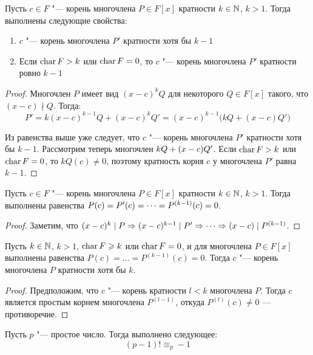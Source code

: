 \begin{theorem}
	Пусть $c \in F$ "--- корень многочлена $P \in F[x]$ кратности $k \in \mathbb{N}$, $k > 1$. Тогда выполнены следующие свойства:
	\begin{enumerate}
		\item $c$ "--- корень многочлена $P'$ кратности хотя бы $k - 1$
		\item Если $\operatorname{char}{F} > k$ или $\operatorname{char}{F} = 0$, то $c$ "--- корень многочлена $P'$ кратности ровно $k - 1$
	\end{enumerate}
\end{theorem}

\begin{proof}
	Многочлен $P$ имеет вид $(x - c)^kQ$ для некоторого $Q \in F[x]$ такого, что $(x - c)\nmid Q$. Тогда:
	\[P' = k(x - c)^{k - 1}Q + (x - c)^kQ' = (x - c)^{k - 1}\big(kQ + (x-c)Q'\big)\]
	
	Из равенства выше уже следует, что $c$ "--- корень многочлена $P'$ кратности хотя бы $k - 1$. Рассмотрим теперь многочлен $kQ \hm{+} (x - c)Q'$. Если $\operatorname{char}{F} > k$ или $\operatorname{char}{F} = 0$, то $kQ(c) \ne 0$, поэтому кратность корня $c$ у многочлена $P'$ равна $k - 1$.
\end{proof}

\begin{corollary}
	Пусть $c \in F$ "--- корень многочлена $P \in F[x]$ кратности $k \in \mathbb{N}$, $k > 1$. Тогда выполнены равенства $P(c) = P'(c) \hm{=} \dots = P^{(k - 1)}(c) = 0$.
\end{corollary}

\begin{proof}
	Заметим, что $(x - c)^k\mid P \Rightarrow (x - c)^{k - 1}\mid P' \hm\Rightarrow \dots \Rightarrow (x - c)\mid P^{(k - 1)}$.
\end{proof}

\begin{corollary}
	Пусть $k \in \mathbb{N}$, $k > 1$, $\operatorname{char}{F} \geqslant k$ или $\operatorname{char}{F} = 0$, и для многочлена $P \in F[x]$ выполнены равенства $P(c) = \dots = P^{(k - 1)}(c) = 0$. Тогда $c$ "--- корень многочлена $P$ кратности хотя бы $k$.
\end{corollary}

\begin{proof}
	Предположим, что $c$ "--- корень кратности $l < k$ многочлена $P$. Тогда $c$ является простым корнем многочлена $P^{(l - 1)}$, откуда $P^{(l)}(c) \ne 0$ --- противоречие.
\end{proof}

\begin{corollary}
	Пусть $p$ "--- простое число. Тогда выполнено следующее:
	\[(p - 1)! \equiv_p -1\]
\end{corollary}

